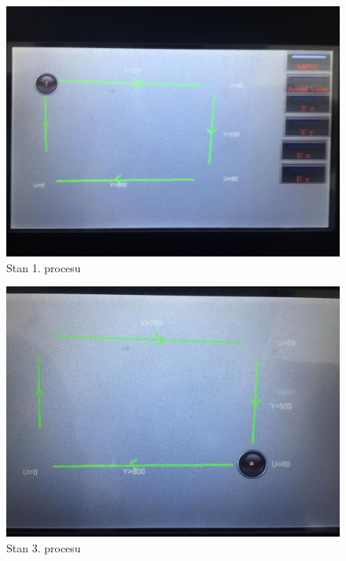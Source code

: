 \begin{figure}[H]
    \label{automat_1}
    \centering
    \leftskip-1.1cm
    \includegraphics[scale=0.2]{./sections/inteco/images/automat1.jpg}
    \caption{Stan 1. procesu}
\end{figure}

\begin{figure}[H]
    \label{automat_3}
    \centering
    \leftskip-1.1cm
    \includegraphics[scale=0.2]{./sections/inteco/images/automat3.jpg}
    \caption{Stan 3. procesu}
\end{figure}
\newpage

